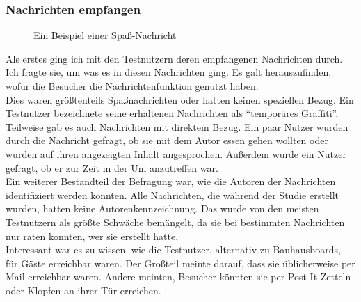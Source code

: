 \subsubsection{Nachrichten empfangen}\label{Nachrichten Empfangen}
\begin{figure}[h!]
  \centering
  \caption{Ein Beispiel einer Spaß-Nachricht}
  \label{img:StudieExampleMessage}
\end{figure}
Als erstes ging ich mit den Testnutzern deren empfangenen Nachrichten durch.
Ich fragte sie, um was es in diesen Nachrichten ging.
Es galt herauszufinden, wofür die Besucher die Nachrichtenfunktion genutzt haben.
\\
Dies waren größtenteils Spaßnachrichten  oder hatten keinen speziellen Bezug. Ein Testnutzer bezeichnete seine erhaltenen Nachrichten als ``temporäres Graffiti''.
Teilweise gab es auch Nachrichten mit direktem Bezug.
Ein paar Nutzer wurden durch die Nachricht gefragt, ob sie mit dem Autor essen gehen wollten oder wurden auf ihren angezeigten Inhalt angesprochen.
Außerdem wurde ein Nutzer gefragt, ob er zur Zeit in der Uni anzutreffen war.
\\
Ein weiterer Bestandteil der Befragung war, wie die Autoren der Nachrichten identifiziert werden konnten.
Alle Nachrichten, die während der Studie erstellt wurden, hatten keine Autorenkennzeichnung.
Das wurde von den meisten Testnutzern als größte Schwäche bemängelt, da sie bei bestimmten Nachrichten nur raten konnten, wer sie erstellt hatte.
\\
Interessant war es zu wissen, wie die Testnutzer, alternativ zu Bauhausboards, für Gäste erreichbar waren.
Der Großteil meinte darauf, dass sie üblicherweise per Mail erreichbar waren.
Andere meinten, Besucher könnten sie per Post-It-Zetteln oder Klopfen an ihrer Tür erreichen.
